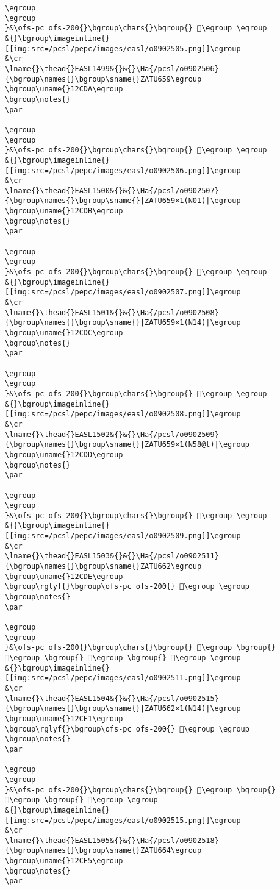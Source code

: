 \begin{verbatim}
\egroup
\egroup
}&\ofs-pc ofs-200{}\bgroup\chars{}\bgroup{} 𒳖\egroup \egroup
&{}\bgroup\imageinline{}[[img:src=/pcsl/pepc/images/easl/o0902505.png]]\egroup
&\cr
\lname{}\thead{}EASL1499&{}&{}\Ha{/pcsl/o0902506}{\bgroup\names{}\bgroup\sname{}ZATU659\egroup
\bgroup\uname{}12CDA\egroup
\bgroup\notes{}
\par 

\egroup
\egroup
}&\ofs-pc ofs-200{}\bgroup\chars{}\bgroup{} 𒳚\egroup \egroup
&{}\bgroup\imageinline{}[[img:src=/pcsl/pepc/images/easl/o0902506.png]]\egroup
&\cr
\lname{}\thead{}EASL1500&{}&{}\Ha{/pcsl/o0902507}{\bgroup\names{}\bgroup\sname{}|ZATU659×1(N01)|\egroup
\bgroup\uname{}12CDB\egroup
\bgroup\notes{}
\par 

\egroup
\egroup
}&\ofs-pc ofs-200{}\bgroup\chars{}\bgroup{} 𒳛\egroup \egroup
&{}\bgroup\imageinline{}[[img:src=/pcsl/pepc/images/easl/o0902507.png]]\egroup
&\cr
\lname{}\thead{}EASL1501&{}&{}\Ha{/pcsl/o0902508}{\bgroup\names{}\bgroup\sname{}|ZATU659×1(N14)|\egroup
\bgroup\uname{}12CDC\egroup
\bgroup\notes{}
\par 

\egroup
\egroup
}&\ofs-pc ofs-200{}\bgroup\chars{}\bgroup{} 𒳜\egroup \egroup
&{}\bgroup\imageinline{}[[img:src=/pcsl/pepc/images/easl/o0902508.png]]\egroup
&\cr
\lname{}\thead{}EASL1502&{}&{}\Ha{/pcsl/o0902509}{\bgroup\names{}\bgroup\sname{}|ZATU659×1(N58@t)|\egroup
\bgroup\uname{}12CDD\egroup
\bgroup\notes{}
\par 

\egroup
\egroup
}&\ofs-pc ofs-200{}\bgroup\chars{}\bgroup{} 𒳝\egroup \egroup
&{}\bgroup\imageinline{}[[img:src=/pcsl/pepc/images/easl/o0902509.png]]\egroup
&\cr
\lname{}\thead{}EASL1503&{}&{}\Ha{/pcsl/o0902511}{\bgroup\names{}\bgroup\sname{}ZATU662\egroup
\bgroup\uname{}12CDE\egroup
\bgroup\rglyf{}\bgroup\ofs-pc ofs-200{} 𒳞\egroup \egroup
\bgroup\notes{}
\par 

\egroup
\egroup
}&\ofs-pc ofs-200{}\bgroup\chars{}\bgroup{} 𒳤\egroup \bgroup{} 𒳠\egroup \bgroup{} 𒳞\egroup \bgroup{} 𒳢\egroup \egroup
&{}\bgroup\imageinline{}[[img:src=/pcsl/pepc/images/easl/o0902511.png]]\egroup
&\cr
\lname{}\thead{}EASL1504&{}&{}\Ha{/pcsl/o0902515}{\bgroup\names{}\bgroup\sname{}|ZATU662×1(N14)|\egroup
\bgroup\uname{}12CE1\egroup
\bgroup\rglyf{}\bgroup\ofs-pc ofs-200{} 𒳡\egroup \egroup
\bgroup\notes{}
\par 

\egroup
\egroup
}&\ofs-pc ofs-200{}\bgroup\chars{}\bgroup{} 𒳡\egroup \bgroup{} 𒳟\egroup \bgroup{} 𒳣\egroup \egroup
&{}\bgroup\imageinline{}[[img:src=/pcsl/pepc/images/easl/o0902515.png]]\egroup
&\cr
\lname{}\thead{}EASL1505&{}&{}\Ha{/pcsl/o0902518}{\bgroup\names{}\bgroup\sname{}ZATU664\egroup
\bgroup\uname{}12CE5\egroup
\bgroup\notes{}
\par 


\end{verbatim}

